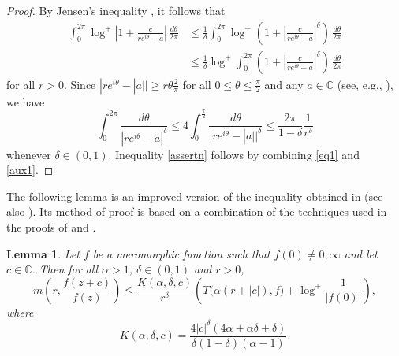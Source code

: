 \documentclass{amsart}
\newcommand{\C}{\mathbb{C}}
\newtheorem{lemma}[theorem]{Lemma}
\theoremstyle{definition}
\numberwithin{equation}{section}
\numberwithin{theorem}{section}
\begin{document}
\begin{proof} By Jensen's inequality \cite[p.~48]{cherryy:01}, it follows that
    \begin{equation}\label{eq1}
    \begin{split}
    \int_0^{2\pi}\log^{+}\left|1+\frac{c}{re^{i\theta}-a}\right|\,\frac{d\theta}{2\pi} &\leq
    \frac{1}{\delta}\int_0^{2\pi} \log^{+}\left(1+\left|\frac{c}{re^{i\theta}-
    a}\right|^\delta\right) \,\frac{d\theta}{2\pi} \\
    &\leq
    \frac{1}{\delta}\log^{+}\int_0^{2\pi} \left(1+\left|\frac{c}{re^{i\theta}-
    a}\right|^\delta\right) \,\frac{d\theta}{2\pi}
    \end{split}
    \end{equation}
for all $r>0$. Since $|re^{i\theta}-|a|| \geq
r\theta\frac{2}{\pi}$ for all $0\leq\theta\leq\frac{\pi}{2}$ and
any $a\in\C$ (see, e.g., \cite[p.~118]{goldbergo:08}), we have
    \begin{equation}\label{aux1}
    \int_0^{2\pi}\frac{d\theta}{|re^{i\theta}-a|^\delta} \leq
    4\int_0^{\frac{\pi}{2}}\frac{d\theta}{|re^{i\theta}-|a||^\delta} \leq \frac{2\pi}{1-
    \delta}\frac{1}{r^\delta}
    \end{equation}
whenever $\delta\in(0,1)$. Inequality \eqref{assertn} follows by
combining \eqref{eq1} and \eqref{aux1}.
\end{proof}


The following lemma is an improved version of the inequality
obtained in \cite[Lemma 2.3]{halburdk:06JMAA} (see also
\cite[Theorem 2.4]{chiangf:08}). Its method of proof is based on a combination of the techniques used in the proofs of \cite[Lemma 3]{hinkkanen:92} and
\cite[Lemma 2.3]{halburdk:06JMAA}.

\begin{lemma}\label{details}
Let $f$ be a meromorphic function such that $f(0)\not=0,\infty$
and let $c\in\C$. Then for all $\alpha >1$, $\delta\in(0,1)$ and
$r>0$,
    \begin{equation*}
    m\left(r,\frac{f(z+c)}{f(z)}\right) \leq
    \frac{K(\alpha,\delta,c)}{r^\delta}\left(T\big(\alpha(r+|c|),f\big)+\log^{+}\frac{1}{|f(0)|}\right),
    \end{equation*}
where
    \begin{equation*}
    K(\alpha,\delta,c)= \frac{4|c|^\delta(4\alpha+\alpha\delta+\delta)}{\delta(1-\delta)(\alpha-1)}.
    \end{equation*}
\end{lemma}
\end{document}
